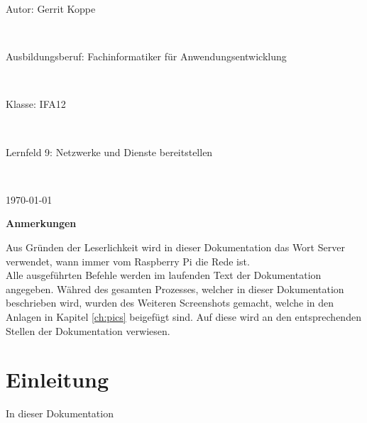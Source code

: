 \documentclass[a4paper, 11pt]{scrartcl}
\begin{document}
\begin{center}
    \vspace{0.1\textheight}
    \begin{Large}
        Autor: Gerrit Koppe
    \end{Large}
    \\
    \vspace{0.5cm}
    \begin{Large}
        Ausbildungsberuf: Fachinformatiker für Anwendungsentwicklung
    \end{Large}
    \\
    \vspace{0.5cm}
    \begin{Large}
        Klasse: IFA12
    \end{Large}
    \\
    \vspace{0.5cm}
    \begin{Large}
        Lernfeld 9: Netzwerke und Dienste bereitstellen
    \end{Large}
    \\
    \vspace{0.5cm}
    \begin{Large}
        \today
    \end{Large}
\end{center}
\newpage
\thispagestyle{empty}
\begin{Large}
    \begin{flushleft}
        \textbf{\textcolor{BBS}{Anmerkungen}}
    \end{flushleft}
\end{Large}
Aus Gründen der Leserlichkeit wird in dieser Dokumentation das Wort \glqq Server\grqq{} verwendet, wann immer vom Raspberry Pi die Rede ist.
\\
Alle ausgeführten Befehle werden im laufenden Text der Dokumentation angegeben. Währed des gesamten Prozesses, welcher in dieser Dokumentation beschrieben wird, wurden des Weiteren Screenshots
gemacht, welche in den Anlagen in Kapitel \ref{ch:pics} beigefügt sind. Auf diese wird an den entsprechenden Stellen der Dokumentation verwiesen.

\newpage
\thispagestyle{empty}
\tableofcontents
\newpage
\clearpage
{}


\section{Einleitung}
In dieser Dokumentation %
\end{document}
